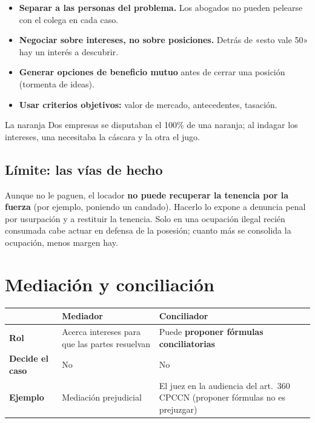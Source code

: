 \begin{itemize}
  \item \textbf{Separar a las personas del problema.} Los abogados no pueden pelearse con el colega en cada caso.
  \item \textbf{Negociar sobre intereses, no sobre posiciones.} Detrás de «esto vale 50» hay un interés a descubrir.
  \item \textbf{Generar opciones de beneficio mutuo} antes de cerrar una posición (tormenta de ideas).
  \item \textbf{Usar criterios objetivos:} valor de mercado, antecedentes, tasación.
\end{itemize}

\begin{example}{La naranja}
Dos empresas se disputaban el 100\% de una naranja; al indagar los intereses, una necesitaba la cáscara y la otra el jugo.
\end{example}

\subsection*{Límite: las vías de hecho}

Aunque no le paguen, el locador \textbf{no puede recuperar la tenencia por la fuerza} (por ejemplo, poniendo un candado). Hacerlo lo expone a denuncia penal por usurpación y a restituir la tenencia. Solo en una ocupación ilegal recién consumada cabe actuar en defensa de la posesión; cuanto más se consolida la ocupación, menos margen hay.

\section{Mediación y conciliación}

\begin{center}
\begin{tabularx}{\textwidth}{>{\raggedright\arraybackslash}p{2.8cm} Y Y}
\toprule
 & \textbf{Mediador} & \textbf{Conciliador} \\
\midrule
\textbf{Rol} & Acerca intereses para que las partes resuelvan & Puede \textbf{proponer fórmulas conciliatorias} \\
\addlinespace
\textbf{Decide el caso} & No & No \\
\addlinespace
\textbf{Ejemplo} & Mediación prejudicial & El juez en la audiencia del art.\ 360 CPCCN (proponer fórmulas no es prejuzgar) \\
\bottomrule
\end{tabularx}
\end{center}

